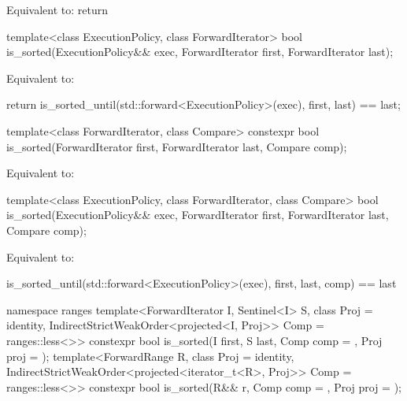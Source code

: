 \begin{itemdescr}
\pnum
\effects
Equivalent to: return 
\end{itemdescr}

%
\begin{itemdecl}
template<class ExecutionPolicy, class ForwardIterator>
  bool is_sorted(ExecutionPolicy&& exec,
                 ForwardIterator first, ForwardIterator last);
\end{itemdecl}

\begin{itemdescr}
\pnum
\effects
Equivalent to:
\begin{codeblock}
return is_sorted_until(std::forward<ExecutionPolicy>(exec), first, last) == last;
\end{codeblock}
\end{itemdescr}

%
\begin{itemdecl}
template<class ForwardIterator, class Compare>
  constexpr bool is_sorted(ForwardIterator first, ForwardIterator last,
                           Compare comp);
\end{itemdecl}

\begin{itemdescr}
\pnum
\effects
Equivalent to: 
\end{itemdescr}


%
\begin{itemdecl}
template<class ExecutionPolicy, class ForwardIterator, class Compare>
  bool is_sorted(ExecutionPolicy&& exec,
                 ForwardIterator first, ForwardIterator last,
                 Compare comp);
\end{itemdecl}

\begin{itemdescr}
\pnum
\effects
Equivalent to:
\begin{codeblock}
is_sorted_until(std::forward<ExecutionPolicy>(exec), first, last, comp) == last
\end{codeblock}
\end{itemdescr}

%
\begin{itemdecl}
namespace ranges {
  template<ForwardIterator I, Sentinel<I> S, class Proj = identity,
      IndirectStrictWeakOrder<projected<I, Proj>> Comp = ranges::less<>>
    constexpr bool is_sorted(I first, S last, Comp comp = {}, Proj proj = {});
  template<ForwardRange R, class Proj = identity,
      IndirectStrictWeakOrder<projected<iterator_t<R>, Proj>> Comp = ranges::less<>>
    constexpr bool is_sorted(R&& r, Comp comp = {}, Proj proj = {});
}
\end{itemdecl}

